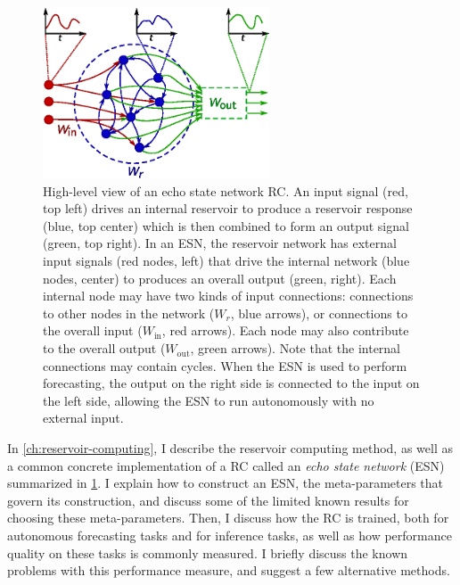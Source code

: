 \begin{figure}
  \includegraphics[width=0.6\textwidth]{figures/reservoir}
  \caption{High-level view of an echo state network RC.  An input
    signal (red, top left) drives an internal reservoir to produce a
    reservoir response (blue, top center) which is then combined to
    form an output signal (green, top right). In an ESN, the reservoir
    network has external input signals (red nodes, left) that drive
    the internal network (blue nodes, center) to produces an overall
    output (green, right).  Each internal node may have two kinds of
    input connections: connections to other nodes in the network
    ($W_r$, blue arrows), or connections to the overall input
    ($W_\text{in}$, red arrows). Each node may also contribute to the
    overall output ($W_\text{out}$, green arrows). Note that the
    internal connections may contain cycles.  When the ESN is used to
    perform forecasting, the output on the right side is connected to
    the input on the left side, allowing the ESN to run autonomously
    with no external input.}%
  \label{fig:intro-reservoir}
\end{figure}

In \cref{ch:reservoir-computing}, I describe the reservoir computing
method, as well as a common concrete implementation of a RC called an
\emph{echo state network} (ESN) summarized in \cref{fig:intro-reservoir}. I
explain how to construct an ESN, the meta-parameters that govern its
construction, and discuss some of the limited known results for
choosing these meta-parameters. Then, I discuss how the RC is trained,
both for autonomous forecasting tasks and for inference tasks, as well
as how performance quality on these tasks is commonly measured. I
briefly discuss the known problems with this performance measure, and
suggest a few alternative methods.

